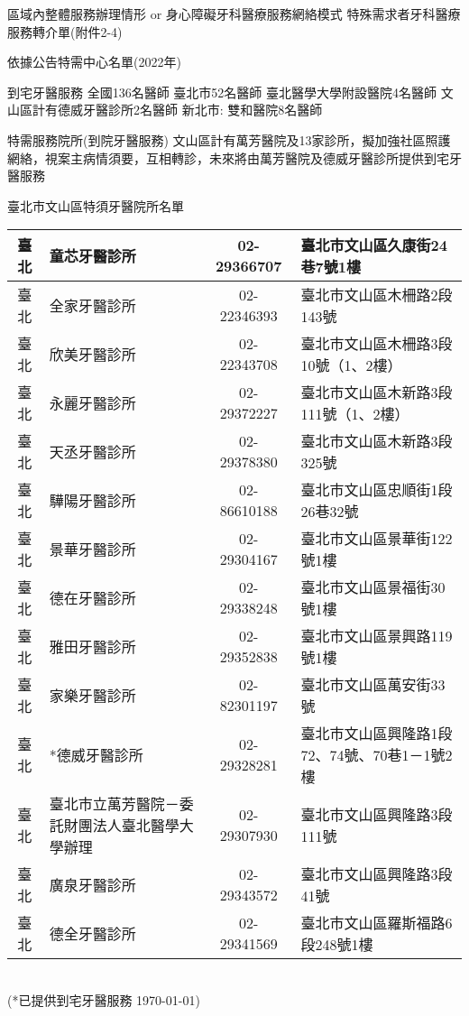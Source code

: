 \clearpage
區域內整體服務辦理情形 or
身心障礙牙科醫療服務網絡模式
特殊需求者牙科醫療服務轉介單(附件2-4)

依據公告特需中心名單(2022年)
\begin{outline}

\1 到宅牙醫服務
\2 全國136名醫師
\2 臺北市52名醫師
    \3 臺北醫學大學附設醫院4名醫師
    \3 文山區計有德威牙醫診所2名醫師
\2 新北市: 雙和醫院8名醫師

\1 特需服務院所(到院牙醫服務)
\2 文山區計有萬芳醫院及13家診所，擬加強社區照護網絡，視案主病情須要，互相轉診，未來將由萬芳醫院及德威牙醫診所提供到宅牙醫服務
\end{outline}

臺北市文山區特須牙醫院所名單\\
\begin{tabularx}{1.0625\textwidth}{|c|p{3.2cm}|c|l|}
\hline
臺北&	童芯牙醫診所&	02-29366707 &	臺北市文山區久康街24巷7號1樓\\
\hline
臺北&	全家牙醫診所&	02-22346393 &	臺北市文山區木柵路2段143號\\
\hline
臺北 &	欣美牙醫診所 &	02-22343708 &	臺北市文山區木柵路3段10號（1、2樓）\\
\hline
臺北 &	永麗牙醫診所 &	02-29372227 &	臺北市文山區木新路3段111號（1、2樓）\\
\hline
臺北 &	天丞牙醫診所 &	02-29378380 &	臺北市文山區木新路3段325號\\
\hline
臺北 &	驊陽牙醫診所 &	02-86610188 &	臺北市文山區忠順街1段26巷32號\\
\hline
臺北 &	景華牙醫診所 &	02-29304167 &	臺北市文山區景華街122號1樓\\
\hline
臺北 &	德在牙醫診所 &	02-29338248 &	臺北市文山區景福街30號1樓\\
\hline
臺北 &	雅田牙醫診所 &	02-29352838 &	臺北市文山區景興路119號1樓\\
\hline
臺北 &	家樂牙醫診所 &	02-82301197 &	臺北市文山區萬安街33號\\
\hline
臺北 &	*德威牙醫診所 &	02-29328281 &	臺北市文山區興隆路1段72、74號、70巷1－1號2樓\\
\hline
臺北 &	臺北市立萬芳醫院－委託財團法人臺北醫學大學辦理
&	02-29307930 &	臺北市文山區興隆路3段111號\\
\hline
臺北 &	廣泉牙醫診所 &	02-29343572 &	臺北市文山區興隆路3段41號\\
\hline
臺北 &	德全牙醫診所 &	02-29341569 &	臺北市文山區羅斯福路6段248號1樓\\
\hline
\end{tabularx}\\
(*已提供到宅牙醫服務 \today)

